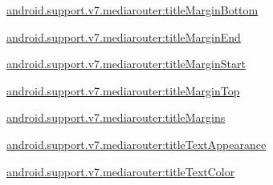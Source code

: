 {\ttfamily \hyperlink{classandroid_1_1support_1_1v7_1_1mediarouter_1_1R_1_1styleable_a1f5dbc575e0bcf37c09dd7506d9b2bcc}{android.\+support.\+v7.\+mediarouter\+:title\+Margin\+Bottom}}

{\ttfamily \hyperlink{classandroid_1_1support_1_1v7_1_1mediarouter_1_1R_1_1styleable_a5591b917ffe94c9777044faf432a7a7d}{android.\+support.\+v7.\+mediarouter\+:title\+Margin\+End}}

{\ttfamily \hyperlink{classandroid_1_1support_1_1v7_1_1mediarouter_1_1R_1_1styleable_a3bb137bbd841404139f825faa9bdacb6}{android.\+support.\+v7.\+mediarouter\+:title\+Margin\+Start}}

{\ttfamily \hyperlink{classandroid_1_1support_1_1v7_1_1mediarouter_1_1R_1_1styleable_aac05bd7aeaa312a603d361f90aa05b12}{android.\+support.\+v7.\+mediarouter\+:title\+Margin\+Top}}

{\ttfamily \hyperlink{classandroid_1_1support_1_1v7_1_1mediarouter_1_1R_1_1styleable_ad349f87bff8904fab761a52216460a76}{android.\+support.\+v7.\+mediarouter\+:title\+Margins}}

{\ttfamily \hyperlink{classandroid_1_1support_1_1v7_1_1mediarouter_1_1R_1_1styleable_affda7df8edd05728ddd53881bbf3018d}{android.\+support.\+v7.\+mediarouter\+:title\+Text\+Appearance}}

{\ttfamily \hyperlink{classandroid_1_1support_1_1v7_1_1mediarouter_1_1R_1_1styleable_a2f89f82b7fae914bc2da54aa27c430c8}{android.\+support.\+v7.\+mediarouter\+:title\+Text\+Color}}

